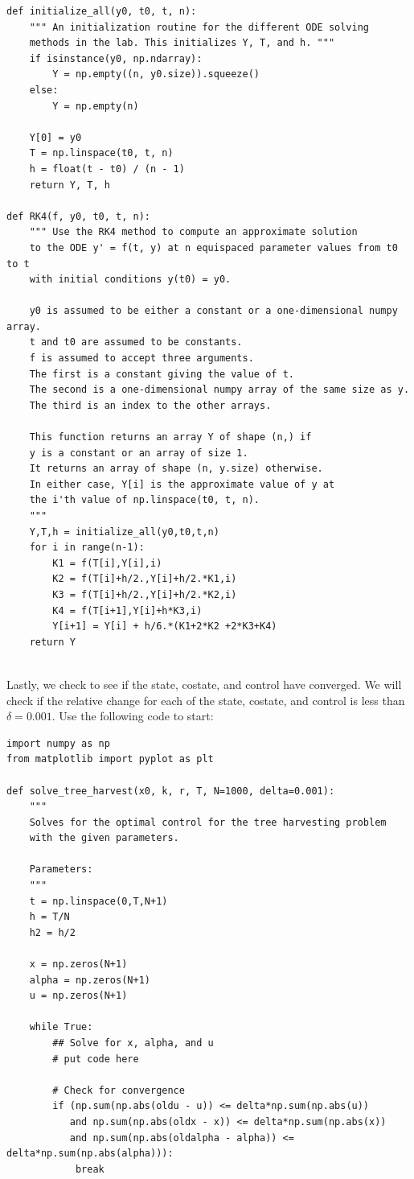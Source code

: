 \begin{lstlisting}
def initialize_all(y0, t0, t, n):
    """ An initialization routine for the different ODE solving
    methods in the lab. This initializes Y, T, and h. """
    if isinstance(y0, np.ndarray):
        Y = np.empty((n, y0.size)).squeeze()
    else:
        Y = np.empty(n)
    
    Y[0] = y0
    T = np.linspace(t0, t, n)
    h = float(t - t0) / (n - 1)
    return Y, T, h

def RK4(f, y0, t0, t, n):
    """ Use the RK4 method to compute an approximate solution
    to the ODE y' = f(t, y) at n equispaced parameter values from t0 to t
    with initial conditions y(t0) = y0.
    
    y0 is assumed to be either a constant or a one-dimensional numpy array.
    t and t0 are assumed to be constants.
    f is assumed to accept three arguments.
    The first is a constant giving the value of t.
    The second is a one-dimensional numpy array of the same size as y.
    The third is an index to the other arrays.
    
    This function returns an array Y of shape (n,) if
    y is a constant or an array of size 1.
    It returns an array of shape (n, y.size) otherwise.
    In either case, Y[i] is the approximate value of y at
    the i'th value of np.linspace(t0, t, n).
    """
    Y,T,h = initialize_all(y0,t0,t,n)
    for i in range(n-1):
        K1 = f(T[i],Y[i],i)
        K2 = f(T[i]+h/2.,Y[i]+h/2.*K1,i)
        K3 = f(T[i]+h/2.,Y[i]+h/2.*K2,i)
        K4 = f(T[i+1],Y[i]+h*K3,i)
        Y[i+1] = Y[i] + h/6.*(K1+2*K2 +2*K3+K4)
    return Y
            
\end{lstlisting}


Lastly, we check to see if the state, costate, and control have converged.
We will check if the relative change for each of the state, costate, and control is less than \(\delta = 0.001\).
Use the following code to start:

\begin{lstlisting}
import numpy as np
from matplotlib import pyplot as plt

def solve_tree_harvest(x0, k, r, T, N=1000, delta=0.001):
    """
    Solves for the optimal control for the tree harvesting problem 
    with the given parameters.
    
    Parameters:
    """
    t = np.linspace(0,T,N+1)
    h = T/N
    h2 = h/2
    
    x = np.zeros(N+1)
    alpha = np.zeros(N+1)
    u = np.zeros(N+1)
    
    while True:
        ## Solve for x, alpha, and u
        # put code here
        
        # Check for convergence
        if (np.sum(np.abs(oldu - u)) <= delta*np.sum(np.abs(u))
           and np.sum(np.abs(oldx - x)) <= delta*np.sum(np.abs(x))
           and np.sum(np.abs(oldalpha - alpha)) <= delta*np.sum(np.abs(alpha))):
            break
            
\end{lstlisting}

